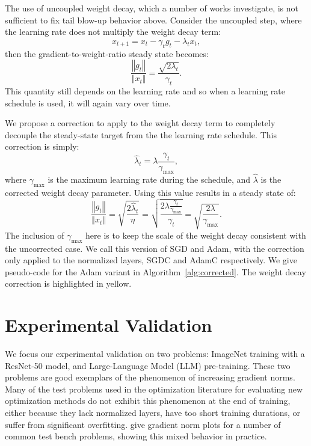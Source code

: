 \documentclass[]{fairmeta}
\begin{document}
The use of uncoupled weight decay, which a number of works \citep{loshchilov2018decoupled, schaipp2023decaynomore} investigate, is not sufficient to fix tail blow-up behavior above. Consider the uncoupled step, where the learning rate does not multiply the weight decay term:
\[
x_{t+1}=x_{t}-\gamma_t g_{t}-\lambda_t x_{t},
\]
then the gradient-to-weight-ratio steady state becomes:
\[
\frac{\left\Vert g_{t}\right\Vert }{\left\Vert x_{t}\right\Vert }=\frac{\sqrt{2\lambda_t}}{\gamma_t}.
\]
This quantity still depends on the learning rate and so when a learning rate schedule is used, it will again vary over time.

We propose a correction to apply to the weight decay term to completely decouple the steady-state target from the the learning rate schedule. This correction is simply:
\[
\hat{\lambda}_t=\lambda\frac{\gamma_t}{\gamma_{\text{max}}},
\]
where $\gamma_{\max}$ is the maximum learning rate during the schedule, and $\hat{\lambda}$ is the corrected weight decay parameter. Using this value results in a steady state of:
\[
\frac{\left\Vert g_{t}\right\Vert }{\left\Vert x_{t}\right\Vert }=\sqrt{\frac{2\hat{\lambda}_{t}}{\eta}}=\sqrt{\frac{2\lambda\frac{\gamma_t}{\gamma_{\text{max}}}}{\gamma_t}}=\sqrt{\frac{2\lambda}{\gamma_{\text{max}}}}.
\]
The inclusion of $\gamma_{\max}$ here is to keep the scale of the weight decay consistent with the uncorrected case. We call this version of SGD and Adam, with the correction only applied to the normalized layers, SGDC and AdamC respectively. We give pseudo-code for the Adam variant in Algorithm~\ref{alg:corrected}. The weight decay correction is highlighted in yellow.

\section{Experimental Validation}

We focus our experimental validation on two problems: ImageNet training with a ResNet-50 model, and Large-Language Model (LLM) pre-training. These two problems are good exemplars of the phenomenon of increasing gradient norms. Many of the test problems used in the optimization literature for evaluating new optimization methods do not exhibit this phenomenon at the end of training, either because they lack normalized layers, have too short training durations, or suffer from significant overfitting. \citet{defazio2023when} give gradient norm plots for a number of common test bench problems, showing this mixed behavior in practice.
\end{document}
